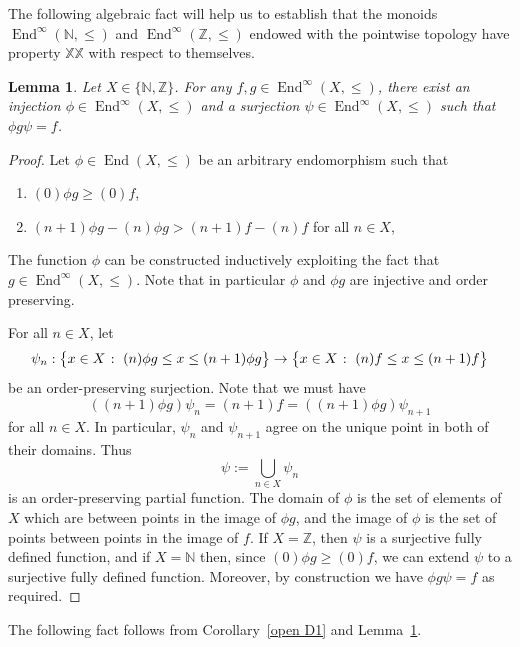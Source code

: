 \documentclass[11pt]{amsart}
\makeatletter
\newtheorem{lemma}[theorem]{Lemma}
\theoremstyle{definition}
\newcommand{\N}{\mathbb N}
\newcommand{\Zendd}{\operatorname{End}(\mathbb Z, \leq)}
\newcommand{\Z}{\mathbb Z}
\newcommand{\makeset}[2]{\left\lbrace #1 \; \colon\;
 \begin{tabular}{@{}l@{}}
   #2
  \end{tabular}
  \right\rbrace}
\makeatother
\begin{document}
The following algebraic fact will help us to establish that the monoids $\operatorname{End}^\infty(\N,\leq)$ and $\operatorname{End}^\infty(\Z,\leq)$ endowed with the pointwise topology have property $\mathbb{XX}$ with respect to themselves.

\begin{lemma}\label{term}
Let \(X\in \{\N,\Z\}\).    For any $f,g\in \operatorname{End}^\infty(X,\leq)$, there exist an injection $\phi\in \operatorname{End}^\infty(X,\leq)$ and a surjection $\psi\in \operatorname{End}^\infty(X,\leq)$ such that $\phi g \psi=f$.
\end{lemma}

 \begin{proof}
Let $\phi\in \operatorname{End}(X,\leq)$ be an arbitrary endomorphism such that 
\begin{enumerate}
    \item $(0)\phi g \geq (0)f$,
    \item $(n+1)\phi g-(n)\phi g> (n+1)f-(n)f$  for all $n\in X$,
\end{enumerate}
The function $\phi$ can be constructed inductively exploiting the fact that $g\in \operatorname{End}^\infty(X,\leq)$.
Note that in particular \(\phi\) and \(\phi g\) are injective and order preserving.
 

For all \(n\in X\), let 
\[\psi_n:\makeset{x\in X}{\((n)\phi g\leq x\leq (n+1)\phi g\)}\rightarrow \makeset{x\in X}{\((n)f\leq x\leq (n+1)f\)}\] be an order-preserving surjection.
Note that we must have 
\[((n+1)\phi g)\psi_n = (n+1)f=((n+1)\phi g)\psi_{n+1}\] for all \(n\in X\).
In particular, \(\psi_n\) and \(\psi_{n+1}\) agree on the unique point in both of their domains.
Thus
\[\psi:=\bigcup_{n\in X} \psi_n\]
is an order-preserving partial function. 
The domain of \(\phi\) is the set of elements of \(X\) which are between points in the image of \(\phi g\), and the image of \(\phi\) is the set of points between points in the image of \(f\).
If \(X=\Z\), then \(\psi\) is a surjective fully defined function, and if \(X=\N\) then, since \((0)\phi g\geq (0)f\), we can extend \(\psi\) to a surjective fully defined function.
Moreover, by construction we have \(\phi g \psi =f\) as required.
\end{proof}

The following fact follows from Corollary~\ref{open D1} and Lemma~\ref{term}.
\end{document}
